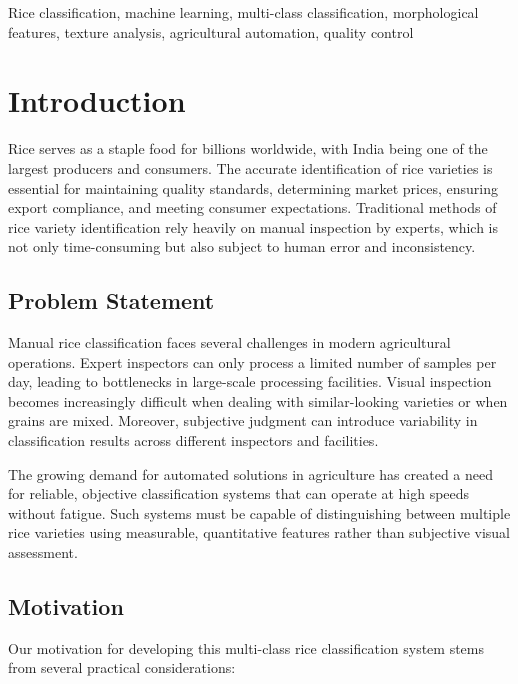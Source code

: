 \documentclass[conference]{IEEEtran}
\begin{document}
\begin{IEEEkeywords}
Rice classification, machine learning, multi-class classification, morphological features, texture analysis, agricultural automation, quality control
\end{IEEEkeywords}

\section{Introduction}

Rice serves as a staple food for billions worldwide, with India being one of the largest producers and consumers. The accurate identification of rice varieties is essential for maintaining quality standards, determining market prices, ensuring export compliance, and meeting consumer expectations. Traditional methods of rice variety identification rely heavily on manual inspection by experts, which is not only time-consuming but also subject to human error and inconsistency.

\subsection{Problem Statement}

Manual rice classification faces several challenges in modern agricultural operations. Expert inspectors can only process a limited number of samples per day, leading to bottlenecks in large-scale processing facilities. Visual inspection becomes increasingly difficult when dealing with similar-looking varieties or when grains are mixed. Moreover, subjective judgment can introduce variability in classification results across different inspectors and facilities.

The growing demand for automated solutions in agriculture has created a need for reliable, objective classification systems that can operate at high speeds without fatigue. Such systems must be capable of distinguishing between multiple rice varieties using measurable, quantitative features rather than subjective visual assessment.

\subsection{Motivation}

Our motivation for developing this multi-class rice classification system stems from several practical considerations:
\end{document}
